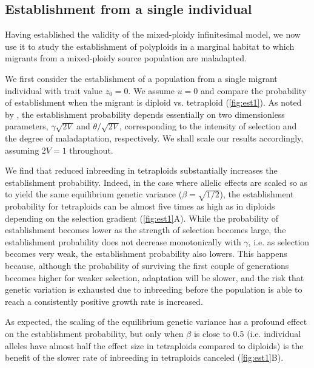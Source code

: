 \documentclass[11pt,a4paper]{article}
\begin{document}
\subsection*{Establishment from a single individual}

Having established the validity of the mixed-ploidy infinitesimal model, we now
use it to study the establishment of polyploids in a marginal habitat to which
migrants from a mixed-ploidy source population are maladapted.

We first consider the establishment of a population from a single migrant
individual with trait value $z_0 = 0$.
We assume $u=0$ and compare the probability of establishment when the migrant
is diploid vs. tetraploid (\cref{fig:est1}).
As noted by \cite{barton2018}, the establishment probability depends
essentially on two dimensionless parameters, $\gamma\sqrt{2V}$ and
$\theta/\sqrt{2V}$, corresponding to the intensity of selection and the degree of
maladaptation, respectively.
We shall scale our results accordingly, assuming $2V=1$ throughout.

We find that reduced inbreeding in tetraploids substantially increases the
establishment probability.
Indeed, in the case where allelic effects are scaled so as to yield the same
equilibrium genetic variance ($\beta = \sqrt{1/2}$), the establishment probability 
for tetraploids can be almost five times as high as in diploids depending on
the selection gradient (\cref{fig:est1}A).
While the probability of establishment becomes lower as the strength of
selection becomes large, the establishment probability does not decrease
monotonically with $\gamma$, i.e. as selection becomes very weak, the
establishment probability also lowers.
This happens because, although the probability of surviving the first couple of
generations becomes higher for weaker selection, adaptation will be slower, and
the risk that genetic variation is exhausted due to inbreeding before the
population is able to reach a consistently positive growth rate is increased.

As expected, the scaling of the equilibrium genetic variance has a profound
effect on the establishment probability, but only when $\beta$ is close to 0.5
(i.e. individual alleles have almost half the effect size in tetraploids
compared to diploids) is the benefit of the slower rate of inbreeding in
tetraploids canceled (\cref{fig:est1}B).
\end{document}
